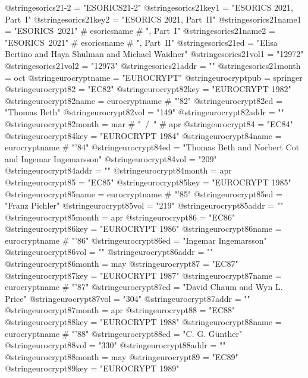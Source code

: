 @string{esorics21-2 =           "ESORICS21-2"}
@string{esorics21key1 =         "ESORICS 2021, Part~I"}
@string{esorics21key2 =         "ESORICS 2021, Part~II"}
@string{esorics21name1 =        "ESORICS~2021" # esoricsname # ", Part~I"}
@string{esorics21name2 =        "ESORICS~2021" # esoricsname # ", Part~II"}
@string{esorics21ed =           "Elisa Bertino and Haya Shulman and Michael Waidner"}
@string{esorics21vol1 =         "12972"}
@string{esorics21vol2 =         "12973"}
@string{esorics21addr =         ""}
@string{esorics21month =        oct}
@string{eurocryptname =         "EUROCRYPT"}
@string{eurocryptpub =          springer}
@string{eurocrypt82 =           "EC82"}
@string{eurocrypt82key =        "EUROCRYPT 1982"}
@string{eurocrypt82name =       eurocryptname # "'82"}
@string{eurocrypt82ed =         "Thomas Beth"}
@string{eurocrypt82vol =        "149"}
@string{eurocrypt82addr =       ""}
@string{eurocrypt82month =      mar # "~/~" # apr}
@string{eurocrypt84 =           "EC84"}
@string{eurocrypt84key =        "EUROCRYPT 1984"}
@string{eurocrypt84name =       eurocryptname # "'84"}
@string{eurocrypt84ed =         "Thomas Beth and Norbert Cot and Ingemar Ingemarsson"}
@string{eurocrypt84vol =        "209"}
@string{eurocrypt84addr =       ""}
@string{eurocrypt84month =      apr}
@string{eurocrypt85 =           "EC85"}
@string{eurocrypt85key =        "EUROCRYPT 1985"}
@string{eurocrypt85name =       eurocryptname # "'85"}
@string{eurocrypt85ed =         "Franz Pichler"}
@string{eurocrypt85vol =        "219"}
@string{eurocrypt85addr =       ""}
@string{eurocrypt85month =      apr}
@string{eurocrypt86 =           "EC86"}
@string{eurocrypt86key =        "EUROCRYPT 1986"}
@string{eurocrypt86name =       eurocryptname # "'86"}
@string{eurocrypt86ed =         "Ingemar Ingemarsson"}
@string{eurocrypt86vol =        ""}
@string{eurocrypt86addr =       ""}
@string{eurocrypt86month =      may}
@string{eurocrypt87 =           "EC87"}
@string{eurocrypt87key =        "EUROCRYPT 1987"}
@string{eurocrypt87name =       eurocryptname # "'87"}
@string{eurocrypt87ed =         "David Chaum and Wyn L. Price"}
@string{eurocrypt87vol =        "304"}
@string{eurocrypt87addr =       ""}
@string{eurocrypt87month =      apr}
@string{eurocrypt88 =           "EC88"}
@string{eurocrypt88key =        "EUROCRYPT 1988"}
@string{eurocrypt88name =       eurocryptname # "'88"}
@string{eurocrypt88ed =         "C. G. G{\"u}nther"}
@string{eurocrypt88vol =        "330"}
@string{eurocrypt88addr =       ""}
@string{eurocrypt88month =      may}
@string{eurocrypt89 =           "EC89"}
@string{eurocrypt89key =        "EUROCRYPT 1989"}
